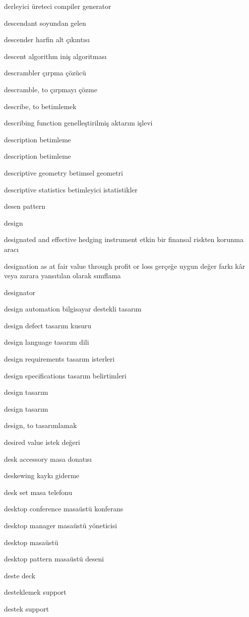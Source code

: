 \documentclass[12pt,fleqn]{article}\usepackage{../../common}
\begin{document}
derleyici üreteci compiler generator

descendant soyundan gelen

descender harfin alt çıkıntısı

descent algorithm iniş algoritması

descrambler çırpma çözücü

descramble, to çırpmayı çözme

describe, to betimlemek

describing function genelleştirilmiş aktarım işlevi

description betimleme

description betimleme

descriptive geometry betimsel geometri

descriptive statistics betimleyici istatistikler

desen pattern

design

designated and effective hedging instrument etkin bir finansal riskten korunma aracı

designation as at fair value through profit or loss gerçeğe uygun değer farkı kâr veya zarara yansıtılan olarak sınıflama

designator

design automation bilgisayar destekli tasarım

design defect tasarım kusuru

design language tasarım dili

design requirements tasarım isterleri

design specifications tasarım belirtimleri

design tasarım

design tasarım

design, to tasarımlamak

desired value istek değeri

desk accessory masa donatısı

deskewing kaykı giderme

desk set masa telefonu

desktop conference masaüstü konferans

desktop manager masaüstü yöneticisi

desktop masaüstü

desktop pattern masaüstü deseni

deste deck

desteklemek support

destek support
\end{document}
